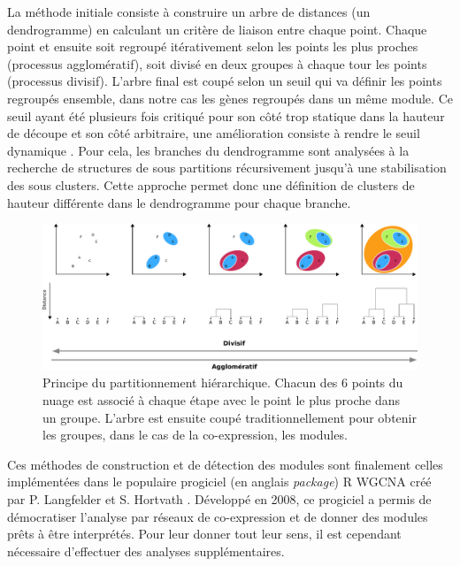 La méthode initiale \cite{Murtagh2012Jan} consiste à construire un arbre de distances (un dendrogramme) en calculant un critère de liaison entre chaque point. Chaque point et ensuite soit regroupé itérativement selon les points les plus proches (processus agglomératif), soit divisé en deux groupes à chaque tour les points (processus divisif). L'arbre final est coupé selon un seuil qui va définir les points regroupés ensemble, dans notre cas les gènes regroupés dans un même module. Ce seuil ayant été plusieurs fois critiqué pour son côté trop statique dans la hauteur de découpe et son côté arbitraire, une amélioration consiste à rendre le seuil dynamique \cite{Langfelder2008_cutree}. Pour cela, les branches du dendrogramme sont analysées à la recherche de structures de sous partitions récursivement jusqu'à une stabilisation des sous clusters. Cette approche permet donc une définition de clusters de hauteur différente dans le dendrogramme pour chaque branche.

\begin{figure}[!h]
    \centering
    \includegraphics[width=\textwidth]{img/intro/3_coexpr/intro_3_coexpr_hierarchical_clustering.pdf}
    \caption{Principe du partitionnement hiérarchique. Chacun des 6 points du nuage est associé à chaque étape avec le point le plus proche dans un groupe. L'arbre est ensuite coupé traditionnellement pour obtenir les groupes, dans le cas de la co-expression, les modules.}
    \label{fig:my_label}
\end{figure}

Ces méthodes de construction et de détection des modules sont finalement celles implémentées dans le populaire progiciel (en anglais \textit{package}) R WGCNA créé par P. Langfelder et S. Hortvath \cite{Langfelder2008}. Développé en 2008, ce progiciel a permis de démocratiser l'analyse par réseaux de co-expression et de donner des modules prêts à être interprétés. Pour leur donner tout leur sens, il est cependant nécessaire d'effectuer des analyses supplémentaires.



